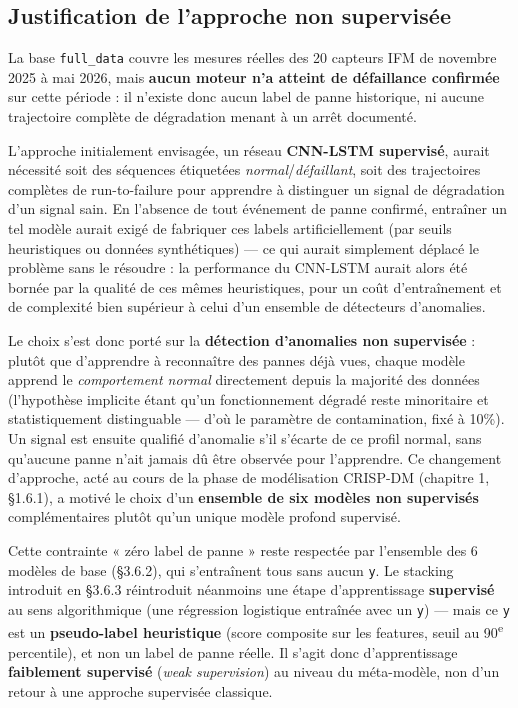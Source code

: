 \documentclass[12pt,a4paper]{report}
\begin{document}
\subsection{Justification de l'approche non supervisée}

La base \texttt{full\_data} couvre les mesures réelles des 20 capteurs IFM de novembre
2025 à mai 2026, mais \textbf{aucun moteur n'a atteint de défaillance confirmée} sur
cette période : il n'existe donc aucun label de panne historique, ni aucune trajectoire
complète de dégradation menant à un arrêt documenté.

L'approche initialement envisagée, un réseau \textbf{CNN-LSTM supervisé}, aurait nécessité
soit des séquences étiquetées \textit{normal}/\textit{défaillant}, soit des trajectoires
complètes de run-to-failure pour apprendre à distinguer un signal de dégradation d'un
signal sain. En l'absence de tout événement de panne confirmé, entraîner un tel modèle
aurait exigé de fabriquer ces labels artificiellement (par seuils heuristiques ou données
synthétiques) — ce qui aurait simplement déplacé le problème sans le résoudre : la
performance du CNN-LSTM aurait alors été bornée par la qualité de ces mêmes heuristiques,
pour un coût d'entraînement et de complexité bien supérieur à celui d'un ensemble de
détecteurs d'anomalies.

Le choix s'est donc porté sur la \textbf{détection d'anomalies non supervisée} : plutôt que
d'apprendre à reconnaître des pannes déjà vues, chaque modèle apprend le \textit{comportement
normal} directement depuis la majorité des données (l'hypothèse implicite étant qu'un
fonctionnement dégradé reste minoritaire et statistiquement distinguable — d'où le paramètre
de contamination, fixé à 10\%). Un signal est ensuite qualifié d'anomalie s'il s'écarte de ce
profil normal, sans qu'aucune panne n'ait jamais dû être observée pour l'apprendre. Ce
changement d'approche, acté au cours de la phase de modélisation CRISP-DM (chapitre 1,
\S1.6.1), a motivé le choix d'un \textbf{ensemble de six modèles non supervisés}
complémentaires plutôt qu'un unique modèle profond supervisé.


\begin{correctionbox}
Cette contrainte « zéro label de panne » reste respectée par l'ensemble des 6 modèles de
base (\S3.6.2), qui s'entraînent tous sans aucun \texttt{y}. Le stacking introduit en
\S3.6.3 réintroduit néanmoins une étape d'apprentissage \textbf{supervisé} au sens
algorithmique (une régression logistique entraînée avec un \texttt{y}) — mais ce
\texttt{y} est un \textbf{pseudo-label heuristique} (score composite sur les features,
seuil au 90\textsuperscript{e} percentile), et non un label de panne réelle. Il s'agit
donc d'apprentissage \textbf{faiblement supervisé} (\textit{weak supervision}) au niveau
du méta-modèle, non d'un retour à une approche supervisée classique.
\end{correctionbox}
\end{document}
